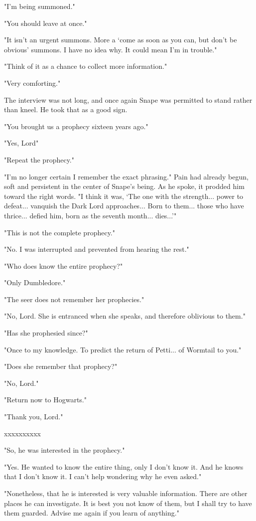 \documentclass[a4paper,11pt]{article}
\begin{document}
"I'm being summoned."

"You should leave at once."

"It isn't an urgent summons. More a `come as soon as you can, but don't be obvious' summons. I have no idea why. It could mean I'm in trouble."

"Think of it as a chance to collect more information."

"Very comforting."

The interview was not long, and once again Snape was permitted to stand rather than kneel. He took that as a good sign.

"You brought us a prophecy sixteen years ago."

"Yes, Lord"

"Repeat the prophecy."

"I'm no longer certain I remember the exact phrasing." Pain had already begun, soft and persistent in the center of Snape's being. As he spoke, it prodded him toward the right words. "I think it was, `The one with the strength... power to defeat... vanquish the Dark Lord approaches... Born to them... those who have thrice... defied him, born as the seventh month... dies...'"

"This is not the complete prophecy."

"No. I was interrupted and prevented from hearing the rest."

"Who does know the entire prophecy?"

"Only Dumbledore."

"The seer does not remember her prophecies."

"No, Lord. She is entranced when she speaks, and therefore oblivious to them."

"Has she prophesied since?"

"Once to my knowledge. To predict the return of Petti... of Wormtail to you."

"Does she remember that prophecy?"

"No, Lord."

"Return now to Hogwarts."

"Thank you, Lord."

xxxxxxxxxx

"So, he was interested in the prophecy."

"Yes. He wanted to know the entire thing, only I don't know it. And he knows that I don't know it. I can't help wondering why he even asked."

"Nonetheless, that he is interested is very valuable information. There are other places he can investigate. It is best you not know of them, but I shall try to have them guarded. Advise me again if you learn of anything."
\end{document}
